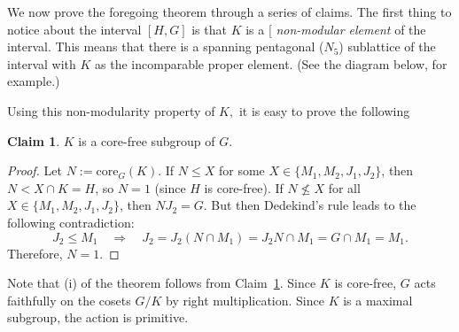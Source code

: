 \documentclass[cm,dissertation]{uhthesis}
\theoremstyle{plain}
\theoremstyle{definition}
\newcounter{claim}
\newtheorem{claim}[claim]{Claim}
\theoremstyle{remark}
\numberwithin{theorem}{section}
\numberwithin{claim}{chapter}
\numberwithin{equation}{section}
\numberwithin{conjecture}{chapter}
\newcommand{\<}{\ensuremath{\langle}}
\renewcommand{\>}{\ensuremath{\rangle}}
\renewcommand{\leq}{\ensuremath{\leqslant}}
\renewcommand{\nleq}{\ensuremath{\nleqslant}}
\newcommand{\core}{\ensuremath{\mathrm{core}}}
\newcommand{\0}{\ensuremath{\mathbf{0}}}
\newcommand{\1}{\ensuremath{\mathbf{1}}}
\newcommand{\2}{\ensuremath{\mathbf{2}}}
\newcommand{\3}{\ensuremath{\mathbf{3}}}
\newcommand{\4}{\ensuremath{\mathbf{4}}}
\newcommand{\5}{\ensuremath{\mathbf{5}}}
\newcommand{\indexit}[1]{\index{#1|textit}}
\def\defn#1{\gdef\defnstring{#1}%
  \xdef\dodefnii{{\noexpand\em
       \defnstring}\noexpand\indexit{\defnstring}\noexpand\makeatother}%
  \futurelet\nextthing\dodefn}
\def\dodefn{%
  \ifx\nextthing[\let\next=\dodefni
    \else\let\next=\dodefnii\fi
  \makeatletter
  \next}
\def\dodefni[#1]{%
  {\em\defnstring}%
  \indexit{#1}%
  \makeatother}
\begin{document}
We now prove the foregoing theorem through a series of claims.
The first thing to notice about the interval $[H,G]$ is that
$K$ is a \defn{non-modular element} of the interval.  This means that
there is a spanning pentagonal ($N_5$) sublattice of the interval with $K$ as the
incomparable proper element. (See the diagram below, for example.)
\begin{center}
  {
}
\end{center}
Using this non-modularity property of $K,$ it is easy to 
prove the following
\begin{claim}
\label{claim:K1corefree}
$K$ is a core-free subgroup of $G$.
\end{claim}
\begin{proof}
  Let $N := \core_G(K)$.  If $N \leq X$ for some $X \in \{M_1, M_2, J_1, J_2\}$, 
then $N < X\cap K = H$, so $N = 1$ (since $H$ is core-free).  If
  $N\nleq X$ for all $X \in \{M_1, M_2, J_1, J_2\}$, then $NJ_2 = G$.  But then
Dedekind's rule leads to the following contradiction:
\[
J_2 \leq M_1 \quad \Rightarrow \quad J_2 = J_2(N\cap M_1) = J_2 N \cap M_1 =
G\cap M_1 = M_1.
\]
Therefore, $N = 1$.
\end{proof}
Note that (i) of the theorem follows from Claim~\ref{claim:K1corefree}.  Since
$K$ is core-free, $G$ acts faithfully on the
cosets $G/K$ by right multiplication.  Since $K$ is a maximal subgroup, the
action is primitive.
\end{document}
